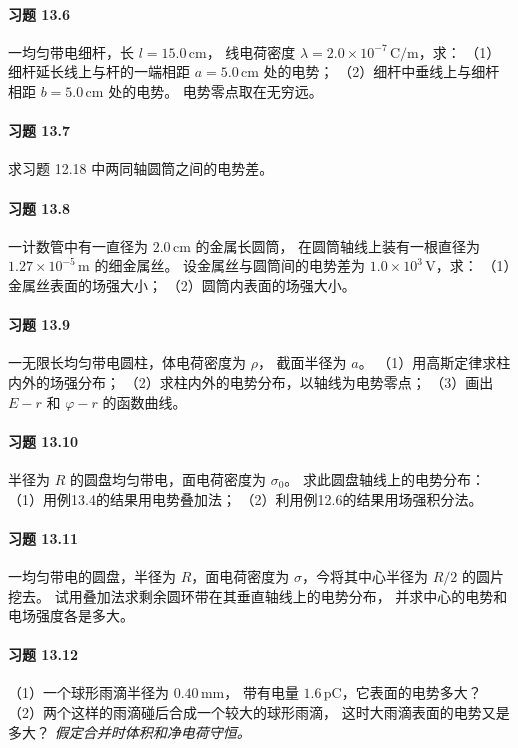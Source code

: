 \paragraph{习题 13.6}
一均匀带电细杆，长 \(l=15.0\,\mathrm{cm}\)，
线电荷密度 \(\lambda=2.0\times10^{-7}\,\mathrm{C/m}\)，求：
（1）细杆延长线上与杆的一端相距 \(a=5.0\,\mathrm{cm}\) 处的电势；
（2）细杆中垂线上与细杆相距 \(b=5.0\,\mathrm{cm}\) 处的电势。
电势零点取在无穷远。

\paragraph{习题 13.7}
求习题 12.18 中两同轴圆筒之间的电势差。

\paragraph{习题 13.8}
一计数管中有一直径为 \(2.0\,\mathrm{cm}\) 的金属长圆筒，
在圆筒轴线上装有一根直径为
\(1.27\times10^{-5}\,\mathrm m\) 的细金属丝。
设金属丝与圆筒间的电势差为 \(1.0\times10^3\,\mathrm V\)，求：
（1）金属丝表面的场强大小；
（2）圆筒内表面的场强大小。

\paragraph{习题 13.9}
一无限长均匀带电圆柱，体电荷密度为 \(\rho\)，
截面半径为 \(a\)。
（1）用高斯定律求柱内外的场强分布；
（2）求柱内外的电势分布，以轴线为电势零点；
（3）画出 \(E-r\) 和 \(\varphi-r\) 的函数曲线。

\paragraph{习题 13.10}
半径为 \(R\) 的圆盘均匀带电，面电荷密度为 \(\sigma_0\)。
求此圆盘轴线上的电势分布：
（1）用例13.4的结果用电势叠加法；
（2）利用例12.6的结果用场强积分法。

\paragraph{习题 13.11}
一均匀带电的圆盘，半径为 \(R\)，面电荷密度为
\(\sigma\)，今将其中心半径为 \(R/2\) 的圆片挖去。
试用叠加法求剩余圆环带在其垂直轴线上的电势分布，
并求中心的电势和电场强度各是多大。

\paragraph{习题 13.12}
（1）一个球形雨滴半径为 \(0.40\,\mathrm{mm}\)，
带有电量 \(1.6\,\mathrm{pC}\)，它表面的电势多大？
（2）两个这样的雨滴碰后合成一个较大的球形雨滴，
这时大雨滴表面的电势又是多大？
\textit{假定合并时体积和净电荷守恒。}

